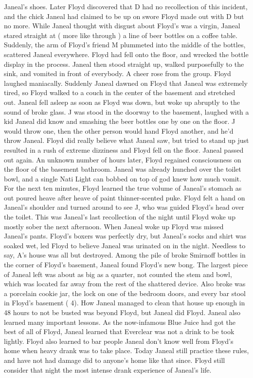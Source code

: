 \documentclass[12pt]{book}
\begin{document}
Janeal's shoes. Later Floyd discovered that D had no recollection of this incident, and the chick Janeal had claimed to be up on swore Floyd made out with D but no more. While Janeal thought with disgust about Floyd's was a virgin, Janeal stared straight at ( more like through ) a line of beer bottles on a coffee table. Suddenly, the arm of Floyd's friend M plummeted into the middle of the bottles, scattered Janeal everywhere. Floyd had fell onto the floor, and wrecked the bottle display in the process. Janeal then stood straight up, walked purposefully to the sink, and vomited in front of everybody. A cheer rose from the group. Floyd laughed maniacally. Suddenly Janeal dawned on Floyd that Janeal was extremely tired, so Floyd walked to a couch in the center of the basement and stretched out. Janeal fell asleep as soon as Floyd was down, but woke up abruptly to the sound of broke glass. J was stood in the doorway to the basement, laughed with a kid Janeal did know and smashing the beer bottles one by one on the floor. J would throw one, then the other person would hand Floyd another, and he'd throw Janeal. Floyd did really believe what Janeal saw, but tried to stand up just resulted in a rush of extreme dizziness and Floyd fell on the floor. Janeal passed out again. An unknown number of hours later, Floyd regained consciousness on the floor of the basement bathroom. Janeal was already hunched over the toilet bowl, and a single Nati Light can bobbed on top of god knew how much vomit. For the next ten minutes, Floyd learned the true volume of Janeal's stomach as out poured heave after heave of paint thinner-scented puke. Floyd felt a hand on Janeal's shoulder and turned around to see J, who was guided Floyd's head over the toilet. This was Janeal's last recollection of the night until Floyd woke up mostly sober the next afternoon. When Janeal woke up Floyd was missed Janeal's pants. Floyd's boxers was perfectly dry, but Janeal's socks and shirt was soaked wet, led Floyd to believe Janeal was urinated on in the night. Needless to say, A's house was all but destroyed. Among the pile of broke Smirnoff bottles in the corner of Floyd's basement, Janeal found Floyd's new bong. The largest piece of Janeal left was about as big as a quarter, not counted the stem and bowl, which was located far away from the rest of the shattered device. Also broke was a porcelain cookie jar, the lock on one of the bedroom doors, and every bar stool in Floyd's basement ( 4). How Janeal managed to clean that house up enough in 48 hours to not be busted was beyond Floyd, but Janeal did Floyd. Janeal also learned many important lessons. As the now-infamous Blue Juice had got the best of all of Floyd, Janeal learned that Everclear was not a drink to be took lightly. Floyd also learned to bar people Janeal don't know well from Floyd's home when heavy drank was to take place. Today Janeal still practice these rules, and have not had damage did to anyone's home like that since. Floyd still consider that night the most intense drank experience of Janeal's life.
\end{document}
